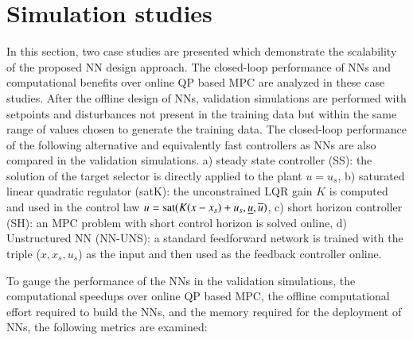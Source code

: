 \documentclass[preprint,5p, twocolumn, authoryear]{elsarticle}
\begin{document}
\section{Simulation studies} \label{sec:simulation_studies}
In this section, two case studies are presented 
which demonstrate the 
scalability of the proposed NN design approach.
The closed-loop performance of NNs and computational benefits over 
online QP based MPC are analyzed in these case studies.
After the offline design of NNs,
validation simulations are performed with 
setpoints and disturbances not present 
in the training data but within the same range 
of values chosen to generate the training data.
The closed-loop performance of the 
following alternative and 
equivalently fast controllers as NNs are also compared
in the validation simulations.
a) steady state controller (SS): the solution
of the target selector is directly applied to the plant 
$u = u_s$, b) saturated linear quadratic regulator (satK):
the unconstrained LQR gain 
$K$ is computed and used in the control law 
$u = \textnormal{sat}(K(x-x_s) + u_s, \underline{u}, \overline{u})$,
c) short horizon controller (SH): an MPC problem
with short control horizon is solved online, 
d) Unstructured NN (NN-UNS): a standard feedforward network is 
trained with the triple ($x, x_s, u_s$) as the input
and then used as the feedback controller online.

To gauge the performance of the NNs in 
the validation simulations, the computational 
speedups over online QP based MPC, the offline
computational effort required to build the NNs,
and the memory required for the deployment of NNs,  
the following metrics are examined:
\end{document}
